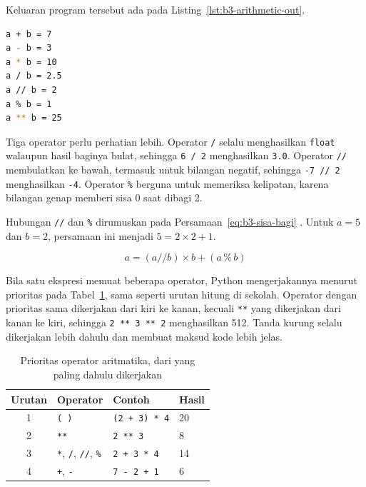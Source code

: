 Keluaran program tersebut ada pada Listing~\ref{lst:b3-arithmetic-out}.

\begin{lstlisting}[language=bash, caption={Keluaran arithmetic_operator.py}, label={lst:b3-arithmetic-out}]
a + b = 7
a - b = 3
a * b = 10
a / b = 2.5
a // b = 2
a % b = 1
a ** b = 25
\end{lstlisting}

Tiga operator perlu perhatian lebih. Operator \texttt{/} selalu menghasilkan \texttt{float} walaupun hasil baginya bulat, sehingga \texttt{6 / 2} menghasilkan \texttt{3.0}. Operator \texttt{//} membulatkan ke bawah, termasuk untuk bilangan negatif, sehingga \texttt{-7 // 2} menghasilkan \texttt{-4}. Operator \texttt{\%} berguna untuk memeriksa kelipatan, karena bilangan genap memberi sisa 0 saat dibagi 2.

Hubungan \texttt{//} dan \texttt{\%} dirumuskan pada Persamaan~\eqref{eq:b3-sisa-bagi} \cite{py-ref-expressions}. Untuk $a = 5$ dan $b = 2$, persamaan ini menjadi $5 = 2 \times 2 + 1$.

\begin{equation}
  a = (a \mathbin{//} b) \times b + (a \mathbin{\%} b)
  \label{eq:b3-sisa-bagi}
\end{equation}

Bila satu ekspresi memuat beberapa operator, Python mengerjakannya menurut prioritas pada Tabel~\ref{tab:b3-prioritas}, sama seperti urutan hitung di sekolah. Operator dengan prioritas sama dikerjakan dari kiri ke kanan, kecuali \texttt{**} yang dikerjakan dari kanan ke kiri, sehingga \texttt{2 ** 3 ** 2} menghasilkan 512. Tanda kurung selalu dikerjakan lebih dahulu dan membuat maksud kode lebih jelas.

\begin{table}[H]
  \centering
  \caption{Prioritas operator aritmatika, dari yang paling dahulu dikerjakan}
  \label{tab:b3-prioritas}
  \begin{tabularx}{\textwidth}{clXl}
    \hline
    \textbf{Urutan} & \textbf{Operator} & \textbf{Contoh} & \textbf{Hasil} \\
    \hline
    1 & \texttt{( )} & \texttt{(2 + 3) * 4} & 20 \\
    \hline
    2 & \texttt{**} & \texttt{2 ** 3} & 8 \\
    \hline
    3 & \texttt{*}, \texttt{/}, \texttt{//}, \texttt{\%} & \texttt{2 + 3 * 4} & 14 \\
    \hline
    4 & \texttt{+}, \texttt{-} & \texttt{7 - 2 + 1} & 6 \\
    \hline
  \end{tabularx}
\end{table}

